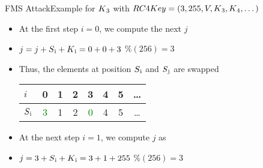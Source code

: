 \documentclass[
	aspectratio=169,	%
	onlytextwidth,		%
	t					%
	]{beamer}
\begin{document}
\begin{frame}[fragile]{FMS Attack}{Example for $K\textsubscript{3}$ with $RC4Key=(3,255,V,K\textsubscript{3},K\textsubscript{4},\dots)$}
	\begin{itemize}
		\item At the first step $i=0$, we compute the next $j$
		\item $j = j + S\textsubscript{i} + K\textsubscript{i} = 0 + 0 + 3$ $\% (256) = 3$
		\item Thus, the elements at position $S\textsubscript{i}$ and $S\textsubscript{j}$ are swapped
		\medskip
		\begin{table}[h!]
			\begin{center}
			  \begin{tabular}{l|c|c|c|c|c|c|c}
				$i$ & 0 & 1 & 2 & 3 & 4 & 5 & \dots\\
				\hline
				$S\textsubscript{i}$ & \textcolor{green}{3} & 1 & 2 & \textcolor{green}{0} & 4 & 5 & \dots\\
			  \end{tabular}
			\end{center}
		  \end{table}
		\item At the next step $i = 1$, we compute $j$ as
		\item $j = 3 + S\textsubscript{i} + K\textsubscript{i} = 3 + 1 + 255$ $\% (256) = 3$
	\end{itemize}
\end{frame}
\end{document}
